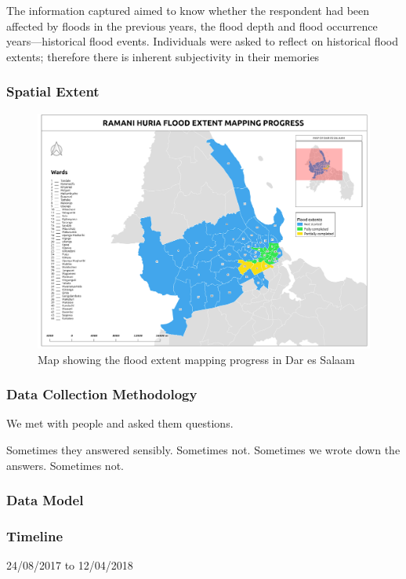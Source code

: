 \documentclass[a4paper,12pt,twoside]{article}
\begin{document}
The information captured aimed to know whether the respondent had been affected by floods in the previous years, the flood depth and flood occurrence years---historical flood events. Individuals were asked to reflect on historical flood extents; therefore there is inherent subjectivity in their memories

\subsubsection{Spatial Extent}
\begin{figure}[h]
  \color{RHgreen}\caption{Map showing the flood extent mapping progress in Dar es Salaam}
  \centering
  \includegraphics[width=1\textwidth]{images/RH_Flood_Extent_Progress.png}
\end{figure}

\subsubsection{Data Collection Methodology}

We met with people and asked them questions.

Sometimes they answered sensibly. Sometimes not. Sometimes we wrote down the answers. Sometimes not.

\subsubsection{Data Model}

\subsubsection{Timeline}
24/08/2017 to 12/04/2018
\end{document}
